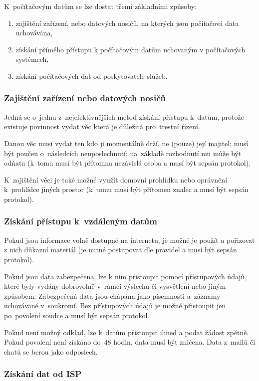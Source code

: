 K~počítačovým datům se lze dostat třemi základními způsoby:
\begin{enumerate}[label=\alph*)]
    \item zajištění zařízení, nebo datových nosičů, na kterých jsou počítačová data uchovávána,
    \item získání přímého přístupu k počítačovým datům uchovaným v počítačových systémech,
    \item získání počítačových dat od poskytovatele služeb.
\end{enumerate}

\subsubsection{Zajištění zařízení nebo datových nosičů}

Jedná se o~jednu z~nejefektivnějších metod získání přístupu k~datům, protože existuje povinnost vydat věc která je důležitá pro~trestní řízení.

Danou věc musí vydat ten kdo ji momentálně drží, ne (pouze) její majitel; musí být poučen o~následcích neuposlechnutí; na~základě rozhodnutí mu může být odňata (k~tomu musí být přítomna nezávislá osoba a musí být sepsán protokol).

K~zajištění věci je také možné využít domovní prohlídku nebo oprávnění k~prohlídce jiných prostor (k~tomu musí být přítomen znalec a musí být sepsán protokol).


\subsubsection{Získání přístupu k~vzdáleným datům}

Pokud jsou informace volně dostupné na internetu, je možné je použít a pořizovat z nich důkazní materiál (je nutné postupovat dle pravidel a musí být sepsán protokol).

Pokud jsou data zabezpečena, lze k nim přistoupit pomocí přístupových údajů, které byly vydány dobrovolně v~rámci výslechu či vysvětlení nebo jiným způsobem.
Zabezpečená data jsou chápána jako písemnosti a~záznamy uchovávané v~soukromí.
Bez přístupových údajů je možné přistoupit jen po~povolení soudce a musí být sepsán protokol.

Pokud není možný odklad, lze k~datům přistoupit ihned a podat žádost zpětně.
Pokud povolení není získáno do~48 hodin, data musí být zničena.
Data z~mailů či chatů se berou jako odposlech.


\subsubsection{Získání dat od ISP}

